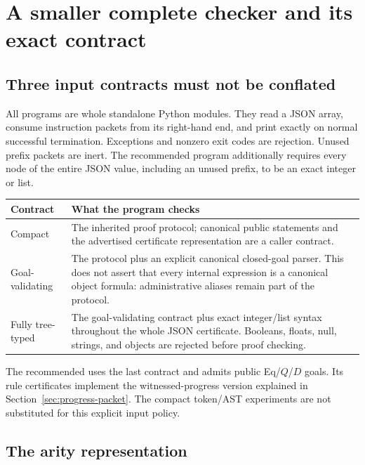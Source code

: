 \section{A smaller complete checker and its exact contract}
\label{sec:checker}

\subsection{Three input contracts must not be conflated}

All programs are whole standalone Python modules. They read a JSON
array, consume instruction packets from its right-hand end, and print
exactly  on normal successful termination. Exceptions and
nonzero exit codes are rejection. Unused prefix packets are inert.
The recommended program additionally requires every node of the entire
JSON value, including an unused prefix, to be an exact integer or list.

\begin{center}\small
\begin{tabularx}{\linewidth}{@{}lX@{}}
\toprule
Contract & What the program checks\\
\midrule
Compact & The inherited proof protocol; canonical public statements and
the advertised certificate representation are a caller contract.\\
Goal-validating & The protocol plus an explicit canonical closed-goal
parser. This does not assert that every internal expression is a canonical
object formula: administrative aliases remain part of the protocol.\\
Fully tree-typed & The goal-validating contract plus exact integer/list
syntax throughout the whole JSON certificate. Booleans, floats, null,
strings, and objects are rejected before proof checking.\\
\bottomrule
\end{tabularx}
\end{center}

The recommended  uses the last contract
and admits public Eq/$Q$/$D$ goals. Its rule certificates implement the
witnessed-progress version explained in Section~\ref{sec:progress-packet}.
The compact token/AST experiments are not substituted for this explicit
input policy.

\subsection{The arity representation}

